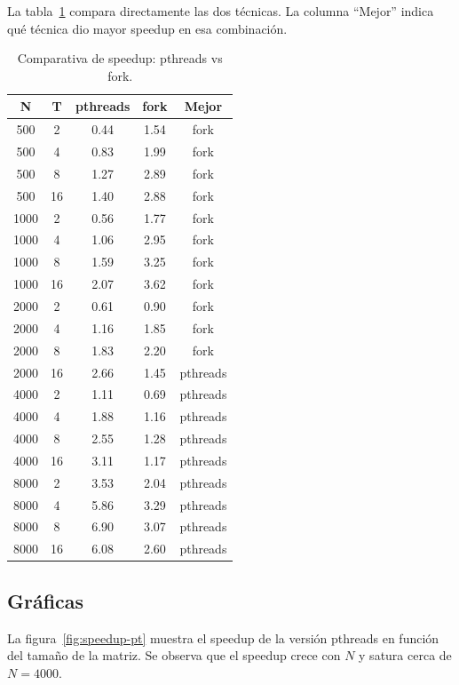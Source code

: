 La tabla~\ref{tab:comparativa} compara directamente las dos técnicas. La columna ``Mejor'' indica qué técnica dio mayor speedup en esa combinación.

\begin{table}[ht]
\centering
\small
\begin{tabular}{|c|c|c|c|c|}
\hline
\textbf{N} & \textbf{T} & \textbf{pthreads} & \textbf{fork} & \textbf{Mejor} \\
\hline
500  & 2  & 0.44 & 1.54 & fork \\
500  & 4  & 0.83 & 1.99 & fork \\
500  & 8  & 1.27 & 2.89 & fork \\
500  & 16 & 1.40 & 2.88 & fork \\
\hline
1000 & 2  & 0.56 & 1.77 & fork \\
1000 & 4  & 1.06 & 2.95 & fork \\
1000 & 8  & 1.59 & 3.25 & fork \\
1000 & 16 & 2.07 & 3.62 & fork \\
\hline
2000 & 2  & 0.61 & 0.90 & fork \\
2000 & 4  & 1.16 & 1.85 & fork \\
2000 & 8  & 1.83 & 2.20 & fork \\
2000 & 16 & 2.66 & 1.45 & pthreads \\
\hline
4000 & 2  & 1.11 & 0.69 & pthreads \\
4000 & 4  & 1.88 & 1.16 & pthreads \\
4000 & 8  & 2.55 & 1.28 & pthreads \\
4000 & 16 & 3.11 & 1.17 & pthreads \\
\hline
8000 & 2  & 3.53 & 2.04 & pthreads \\
8000 & 4  & 5.86 & 3.29 & pthreads \\
8000 & 8  & 6.90 & 3.07 & pthreads \\
8000 & 16 & 6.08 & 2.60 & pthreads \\
\hline
\end{tabular}
\caption{Comparativa de speedup: pthreads vs fork.}
\label{tab:comparativa}
\end{table}

\subsection{Gráficas}

La figura~\ref{fig:speedup-pt} muestra el speedup de la versión pthreads en función del tamaño de la matriz. Se observa que el speedup crece con $N$ y satura cerca de $N = 4000$.

